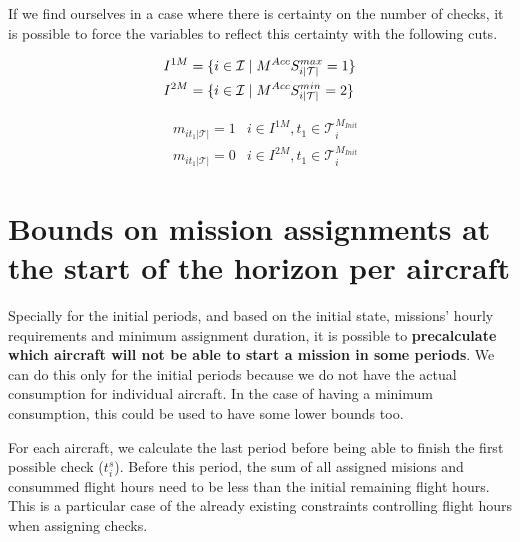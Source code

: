 \documentclass[a4paper,onecolumn,fleqn]{article}
\begin{document}
   If we find ourselves in a case where there is certainty on the number of checks, it is possible to force the variables to reflect this certainty with the following cuts.

  \begin{align}
    & I^{1M} = \{i \in \mathcal{I} \mid M^{Acc}S^{max}_{i|\mathcal{T}|} = 1\} \notag \\
    & I^{2M} = \{i \in \mathcal{I} \mid M^{Acc}S^{min}_{i|\mathcal{T}|} = 2\} \notag
  \end{align}

  \begin{align}
    & m_{it_1|\mathcal{T}|} =  1
      & i \in I^{1M}, t_1 \in \mathcal{T}^{M_{Init}}_i \\
    & m_{it_1|\mathcal{T}|} =  0
      & i \in I^{2M}, t_1 \in \mathcal{T}^{M_{Init}}_i
  \end{align}


\section{Bounds on mission assignments at the start of the horizon per aircraft} \label{mission-assignment-for-initial-periods}

  Specially for the initial periods, and based on the initial state, missions' hourly requirements and minimum assignment duration, it is possible to \textbf{precalculate which aircraft will not be able to start a mission in some periods}. We can do this only for the initial periods because we do not have the actual consumption for individual aircraft.  In the case of having a minimum consumption, this could be used to have some lower bounds too. 

  For each aircraft, we calculate the last period before being able to finish the first possible check ($t^{s}_i$). Before this period, the sum of all assigned misions and consummed flight hours need to be less than the initial remaining flight hours. This is a particular case of the already existing constraints controlling flight hours when assigning checks.
\end{document}

